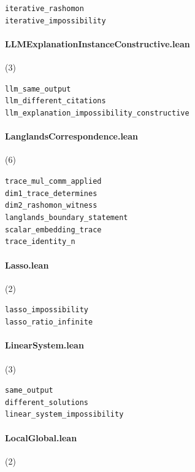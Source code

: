 {\footnotesize
\texttt{iterative\_rashomon}\\
\texttt{iterative\_impossibility}\\
}

\paragraph{LLMExplanationInstanceConstructive.lean} (3)

{\footnotesize
\texttt{llm\_same\_output}\\
\texttt{llm\_different\_citations}\\
\texttt{llm\_explanation\_impossibility\_constructive}\\
}

\paragraph{LanglandsCorrespondence.lean} (6)

{\footnotesize
\texttt{trace\_mul\_comm\_applied}\\
\texttt{dim1\_trace\_determines}\\
\texttt{dim2\_rashomon\_witness}\\
\texttt{langlands\_boundary\_statement}\\
\texttt{scalar\_embedding\_trace}\\
\texttt{trace\_identity\_n}\\
}

\paragraph{Lasso.lean} (2)

{\footnotesize
\texttt{lasso\_impossibility}\\
\texttt{lasso\_ratio\_infinite}\\
}

\paragraph{LinearSystem.lean} (3)

{\footnotesize
\texttt{same\_output}\\
\texttt{different\_solutions}\\
\texttt{linear\_system\_impossibility}\\
}

\paragraph{LocalGlobal.lean} (2)

